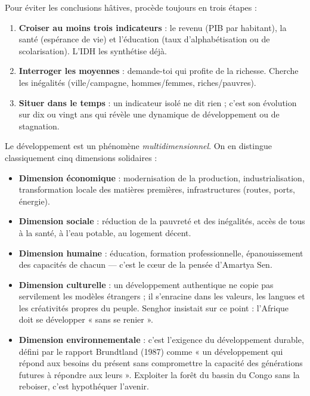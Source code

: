 \documentclass[11pt]{article}
\newcommand{\cle}[1]{{\popxbold\color{popdark}#1}}
\newcounter{popsec}
\newcounter{popsub}
\newcommand{\courssub}[1]{%
  \stepcounter{popsub}%
  \par\vspace{9pt}\noindent{\popxbold\fontsize{11.5}{13}\selectfont\color{popink}{\color{poporange}\thepopsec.\thepopsub}\hspace{6pt}#1}\par\nopagebreak\vspace{4pt}
}
\begin{document}
\begin{methode}
Pour éviter les conclusions hâtives, procède toujours en trois étapes :
\begin{enumerate}
\item \textbf{Croiser au moins trois indicateurs} : le revenu (PIB par habitant), la santé (espérance de vie) et l'éducation (taux d'alphabétisation ou de scolarisation). L'IDH les synthétise déjà.
\item \textbf{Interroger les moyennes} : demande-toi qui profite de la richesse. Cherche les inégalités (ville/campagne, hommes/femmes, riches/pauvres).
\item \textbf{Situer dans le temps} : un indicateur isolé ne dit rien ; c'est son évolution sur dix ou vingt ans qui révèle une dynamique de développement ou de stagnation.
\end{enumerate}
\end{methode}

\courssub{Les dimensions du développement}

Le développement est un phénomène \emph{multidimensionnel}. On en distingue classiquement cinq dimensions solidaires :

\begin{itemize}
\item \textbf{Dimension économique} : modernisation de la production, industrialisation, transformation locale des matières premières, infrastructures (routes, ports, énergie).
\item \textbf{Dimension sociale} : réduction de la pauvreté et des inégalités, accès de tous à la santé, à l'eau potable, au logement décent.
\item \textbf{Dimension humaine} : éducation, formation professionnelle, épanouissement des capacités de chacun — c'est le cœur de la pensée d'Amartya Sen.
\item \textbf{Dimension culturelle} : un développement authentique ne copie pas servilement les modèles étrangers ; il s'enracine dans les valeurs, les langues et les créativités propres du peuple. Senghor insistait sur ce point : l'Afrique doit se développer « sans se renier ».
\item \textbf{Dimension environnementale} : c'est l'exigence du \cle{développement durable}, défini par le rapport Brundtland (1987) comme « un développement qui répond aux besoins du présent sans compromettre la capacité des générations futures à répondre aux leurs ». Exploiter la forêt du bassin du Congo sans la reboiser, c'est hypothéquer l'avenir.
\end{itemize}
\end{document}
